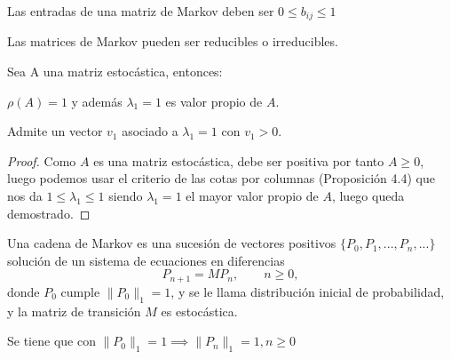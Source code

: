 \begin{nota}
\begin{nlist}
\item Las entradas de una matriz de Markov deben ser $0\leq b_{ij} \leq 1$
\item Las matrices de Markov pueden ser reducibles o irreducibles.
\end{nlist}
\end{nota}

\begin{nprop}
Sea A una matriz estocástica, entonces:
\begin{nlist}
\item $\rho(A)=1$ y además $\lambda_{1}=1$ es valor propio de $A$.
\item Admite un vector $v_{1}$ asociado a $\lambda_{1}=1$ con $v_{1}>0$.
\end{nlist}
\end{nprop}

\begin{proof}
Como $A$ es una matriz estocástica, debe ser positiva por tanto $A\geq 0$, luego podemos usar el criterio de las cotas por columnas (Proposición 4.4) que nos da $1 \leq \lambda_{1} \leq 1$ siendo $\lambda_{1}=1$ el mayor valor propio de $A$, luego queda demostrado.
\end{proof}

\begin{ndef}
Una cadena de Markov es una sucesión de vectores positivos $\{P_{0},P_{1},...,P_{n},...\}$ solución de un sistema de ecuaciones en diferencias
$$ P_{n+1}=MP_{n}, \qquad n\geq 0,$$
donde $P_{0}$ cumple $\|P_{0}\|_{1}=1$, y se le llama distribución inicial de probabilidad, y la matriz de transición $M$ es estocástica.
\end{ndef}

\begin{nota}
Se tiene que con $\|P_{0}\|_{1}= 1 \implies \|P_{n}\|_{1}=1,n\geq 0$
\end{nota}

